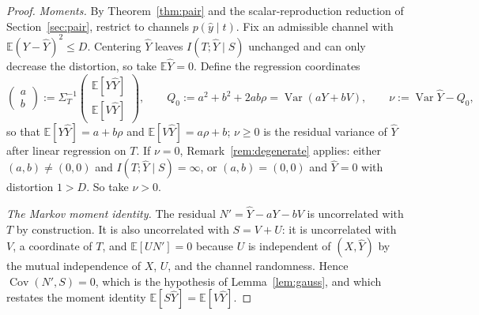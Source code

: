 ﻿\documentclass[11pt,onecolumn]{IEEEtran}
\newcommand{\E}{\mathbb{E}}
\newcommand{\Cov}{\operatorname{Cov}}
\newcommand{\hY}{\widehat{Y}}
\begin{document}
\begin{proof}
\emph{Moments.} By Theorem~\ref{thm:pair} and the scalar-reproduction
reduction of Section~\ref{sec:pair}, restrict to channels
$p(\hat y\mid t)$. Fix an admissible channel with
$\E(Y-\hY)^2\le D$. Centering $\hY$ leaves $I(T;\hY\mid S)$ unchanged
and can only decrease the distortion, so take $\E\hY=0$. Define the
regression coordinates
\[
\begin{pmatrix}a\\b\end{pmatrix}
:=\Sigma_T^{-1}\begin{pmatrix}\E[Y\hY]\\ \E[V\hY]\end{pmatrix},
\qquad
Q_0:=a^2+b^2+2ab\rho=\operatorname{Var}(aY+bV),
\qquad
\nu:=\operatorname{Var}\hY-Q_0,
\]
so that $\E[Y\hY]=a+b\rho$ and $\E[V\hY]=a\rho+b$; $\nu\ge0$ is the
residual variance of $\hY$ after linear regression on $T$. If $\nu=0$,
Remark~\ref{rem:degenerate} applies: either $(a,b)\ne(0,0)$ and
$I(T;\hY\mid S)=\infty$, or $(a,b)=(0,0)$ and $\hY=0$ with distortion
$1>D$. So take $\nu>0$.

\emph{The Markov moment identity.} The residual $N'=\hY-aY-bV$ is
uncorrelated with $T$ by construction. It is also uncorrelated with
$S=V+U$: it is uncorrelated with $V$, a coordinate of $T$, and
$\E[UN']=0$ because $U$ is independent of $(X,\hY)$ by the mutual
independence of $X$, $U$, and the channel randomness. Hence
$\Cov(N',S)=0$, which is the hypothesis of Lemma~\ref{lem:gauss}, and
which restates the moment identity $\E[S\hY]=\E[V\hY]$.


\end{proof}
\end{document}
